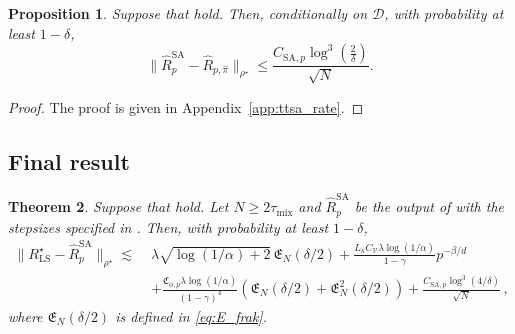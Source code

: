 \documentclass{article}
\newtheorem{proposition}{Proposition}[section]
\newtheorem{theorem}[proposition]{Theorem}
\theoremstyle{definition}
\theoremstyle{remark}
\theoremstyle{plain}
\newcommand{\tmix}{\tau_{\mathrm{mix}}}
\def\eqsp{\,}
\newcommand{\dsieve}{p}
\numberwithin{equation}{section}
\begin{document}
\begin{proposition}
\label{prop:TTSA-error-bound}
Suppose that  hold. Then, conditionally on \(\mathcal D\), with probability at least \(1-\delta\),
\begin{equation}
\label{eq:reward-TTSA-high-probability-rate}
    \|\widehat R_{\dsieve}^{\mathrm{SA}}
      -\widehat R_{\dsieve,\widehat\pi}\|_{\rho^\star}
    \le
    \frac{C_{\mathrm{SA},\dsieve}\log^3(\frac{2}{\delta})}{\sqrt{N}}.
\end{equation}
\end{proposition}
\begin{proof}
The proof is given in Appendix~\ref{app:ttsa_rate}.
\end{proof}






\subsection{Final result}
\label{subsec:estimated-Bellman-final}

\begin{theorem}
\label{thm:estimated-Bellman-operator}
Suppose that
hold. Let \(N\ge 2\tmix\) and \(\widehat R_{\dsieve}^{\mathrm{SA}}\) be the output of
 with the stepsizes specified in
. Then, with probability at least \(1-\delta\),
\begin{align}
\label{eq:final-reward-bound}
    \|R_{\mathrm{LS}}^\star-\widehat R_{\dsieve}^{\mathrm{SA}}\|_{\rho^\star}
    \lesssim\;&
    \lambda
    \sqrt{\log(1/\alpha) + 2}\,
    \mathfrak E_N(\delta/2)
    +
    \frac{
        L_{\kappa}C_{\mathcal V}
        \lambda\log(1/\alpha)
    }{1-\gamma}
    \dsieve^{-\beta/d}
    \\
    &+
    \frac{
        \mathfrak C_{\phi,\dsieve}
        \lambda\log(1/\alpha)
    }{(1-\gamma)^4}
    \left(
        \mathfrak E_N(\delta/2)
        +
        \mathfrak E_N^2(\delta/2)
    \right)
    +
    \frac{
        C_{\mathrm{SA},\dsieve}
        \log^3(4/\delta)
    }{\sqrt N}\eqsp,
\end{align}
where \(\mathfrak E_N(\delta/2)\) is defined in \eqref{eq:E_frak}.
\end{theorem}
\end{document}
